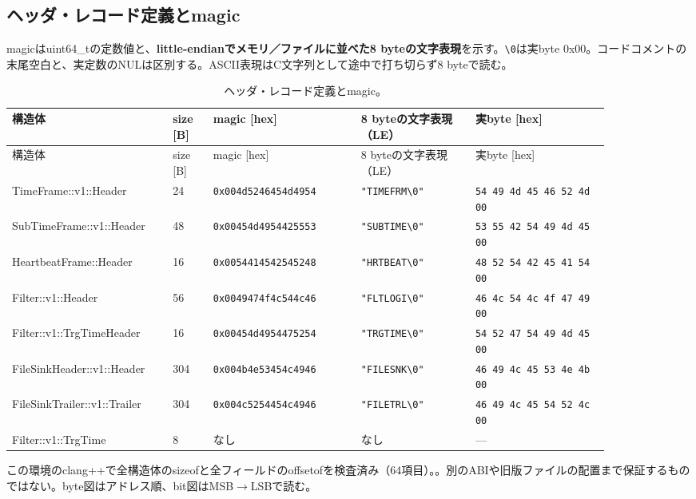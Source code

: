 \FloatBarrier
\subsection{ヘッダ・レコード定義とmagic}
\label{sec:format-html-headers}
magicはuint64\_tの定数値と、\textbf{little-endianでメモリ／ファイルに並べた8 byteの文字表現}を示す。\texttt{\textbackslash{}0}は実byte 0x00。コードコメントの末尾空白と、実定数のNULは区別する。ASCII表現はC文字列として途中で打ち切らず8 byteで読む。


\FloatBarrier
{\footnotesize\setlength{\tabcolsep}{3pt}\begin{longtable}{p{0.22\linewidth}p{0.06\linewidth}p{0.22\linewidth}p{0.17\linewidth}p{0.2\linewidth}}
\caption{ヘッダ・レコード定義とmagic。}\label{tab:format-html-2}\\
\hline
構造体 & size [B] & magic [hex] & 8 byteの文字表現（LE） & 実byte [hex] \\ \hline\endfirsthead
\hline 構造体 & size [B] & magic [hex] & 8 byteの文字表現（LE） & 実byte [hex] \\ \hline\endhead
{TimeFrame::v1::Header} & {24} & {\texttt{0x004d5246454d4954}} & {\texttt{"TIMEFRM\textbackslash{}0"}} & {\texttt{54 49 4d 45 46 52 4d 00}} \\
{SubTimeFrame::v1::Header} & {48} & {\texttt{0x00454d4954425553}} & {\texttt{"SUBTIME\textbackslash{}0"}} & {\texttt{53 55 42 54 49 4d 45 00}} \\
{HeartbeatFrame::Header} & {16} & {\texttt{0x0054414542545248}} & {\texttt{"HRTBEAT\textbackslash{}0"}} & {\texttt{48 52 54 42 45 41 54 00}} \\
{Filter::v1::Header} & {56} & {\texttt{0x0049474f4c544c46}} & {\texttt{"FLTLOGI\textbackslash{}0"}} & {\texttt{46 4c 54 4c 4f 47 49 00}} \\
{Filter::v1::TrgTimeHeader} & {16} & {\texttt{0x00454d4954475254}} & {\texttt{"TRGTIME\textbackslash{}0"}} & {\texttt{54 52 47 54 49 4d 45 00}} \\
{FileSinkHeader::v1::Header} & {304} & {\texttt{0x004b4e53454c4946}} & {\texttt{"FILESNK\textbackslash{}0"}} & {\texttt{46 49 4c 45 53 4e 4b 00}} \\
{FileSinkTrailer::v1::Trailer} & {304} & {\texttt{0x004c5254454c4946}} & {\texttt{"FILETRL\textbackslash{}0"}} & {\texttt{46 49 4c 45 54 52 4c 00}} \\
{Filter::v1::TrgTime} & {8} & {なし} & {なし} & {—} \\
\hline\end{longtable}}
この環境のclang++で全構造体のsizeofと全フィールドのoffsetofを検査済み（64項目）。。別のABIや旧版ファイルの配置まで保証するものではない。byte図はアドレス順、bit図はMSB$\rightarrow$LSBで読む。


